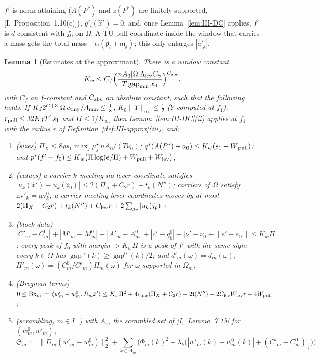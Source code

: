 \documentclass[10pt]{amsart}
\newtheorem{lemma}[theorem]{Lemma}
\theoremstyle{definition}
\theoremstyle{remark}
\newcommand{\gap}{\operatorname{gap}}
\newcommand{\zh}{\hat z}
\newcommand{\ip}[2]{\langle #1,#2\rangle}
\begin{document}
$f'$ is norm attaining ($A(P^*)$ and $z(P^*)$ are finitely supported,
[I,~Proposition~1.10(c)]), $g'_i(\hat x')=0$, and, once Lemma~\ref{lem:III-DC}
applies, $f'$ is $d$-consistent with $f_0$ on $\Omega$.  A TU pull coordinate
inside the window that carries a mass gets the total mass $-\epsilon_l
(\mathfrak p_l+\mathsf m_j)$; this only enlarges $|a'_j|$.

\begin{lemma}[Estimates at the approximant]\label{lem:III-UE1}
There is a window constant
\[
 K_w\le C_f\Big(\frac{nA_0|\Omega|\Lambda_{\rm lev}C_S}{T\gap_{\min}x_0}\Big)^{C_{\rm abs}},
\]
with $C_f$ an $f$-constant and $C_{\rm abs}$ an absolute constant, such that the
following holds.  If $K_J2^{G+3}|\Omega|c_{\rm tiny}/A_{\min}\le\frac18$,
$K_0\|Y\|_\infty\le\frac12$ \textup{(}$Y$ computed at $f_1$\textup{)},
$r_{\rm pull}\le32K_JT^4s_1$ and $\Pi\le1/K_w$, then Lemma~\ref{lem:III-DC}\textup{(ii)} applies at $f_1$ with the
radius $r$ of Definition~\ref{def:III-approx}(iii), and:
\begin{enumerate}
\item[(a)] \textup{(sizes)} $\Pi_X\le8\rho s_1\max_j\mu^\star_j\,nA_0/(T\nu_0)$;
$q^*(A(P^*)-a_0)\le K_w(s_1+\overline W_{\rm pull})$; and
$p^*(f'-f_0)\le K_w\big(\Pi\log(e/\Pi)+W_{\rm pull}+W_{\rm lev}\big)$;
\item[(b)] \textup{(values)} a carrier $k$ meeting no lever coordinate satisfies
$|u_k(\hat x')-u_k(\zh_0)|\le2(\Pi_X+C_2r)+t_k(N'')$; carriers of $\Omega$
satisfy $\mathrm{nv}'_k=\mathrm{nv}^0_k$; a carrier meeting lever coordinates
moves by at most $2(\Pi_X+C_2r)+t_k(N'')+C_{\rm lev}r+2\sum_{j_p}|u_k(j_p)|$;
\item[(c)] \textup{(block data)} $|C'_m-C^0_m|+|M'_m-M^0_m|+|A'_m-A^0_m|+|c'-q^0_0|
+|\nu'-\nu_0|+\|e'-e_0\|\le K_w\Pi$; every peak of $f_0$ with margin $>K_w\Pi$
is a peak of $f'$ with the same sign; every $k\in\Omega$ has $\gap'(k)\ge
\gap^0(k)/2$; and $d'_m(\omega)=d_m(\omega)$, $H'_m(\omega)=(C^0_m/C'_m)
H_m(\omega)$ for $\omega$ supported in $\Omega_m$;
\item[(d)] \textup{(Bregman terms)} $0\le\mathrm{Bx}_m:=\ip{w'_m-w^0_m}{R_m\hat x'}
\le K_w\Pi^2+4c_{\rm fine}(\Pi_X+C_2r)+2\mathfrak t(N'')+2C_{\rm lev}W_{\rm lev}r
+4W_{\rm pull}$;
\item[(e)] \textup{(scrambling, $m\in I_-$)} with $A_m$ the scrambled set of
[I,~Lemma~7.15] for $(w^0_m,w'_m)$,
\[
 \mathfrak S_m:=\|D_m(w'_m-w^0_m)\|_2^2+\sum_{k\in A_m}\Big(\Phi_m(k)^2+
 \lambda_k\big(|w'_m(k)-w^0_m(k)|+(C'_m-C^0_m)_+\big)\Big)
\]

\end{enumerate}
\end{lemma}
\end{document}
